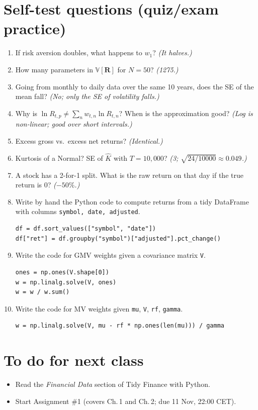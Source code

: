 \documentclass[11pt,a4paper]{report}
\newcommand{\V}{\mathbb{V}}
\newcommand{\R}{\bm{R}}
\begin{document}
\section{Self-test questions (quiz/exam practice)}
\begin{enumerate}
  \item If risk aversion doubles, what happens to $w_1$? \emph{(It halves.)}
  \item How many parameters in $\V[\R]$ for $N=50$? \emph{(1275.)}
  \item Going from monthly to daily data over the same 10 years, does the SE of
    the mean fall? \emph{(No; only the SE of volatility falls.)}
  \item Why is $\ln R_{t,p}\neq\sum_n w_{t,n}\ln R_{t,n}$? When is the
    approximation good? \emph{(Log is non-linear; good over short intervals.)}
  \item Excess gross vs.\ excess net returns? \emph{(Identical.)}
  \item Kurtosis of a Normal? SE of $\hat K$ with $T=10{,}000$?
    \emph{(3; $\sqrt{24/10000}\approx0.049$.)}
  \item A stock has a 2-for-1 split. What is the raw return on that day if
    the true return is 0? \emph{($-50\%$.)}
  \item Write by hand the Python code to compute returns from a tidy
    DataFrame with columns \texttt{symbol, date, adjusted}.
\begin{lstlisting}
df = df.sort_values(["symbol", "date"])
df["ret"] = df.groupby("symbol")["adjusted"].pct_change()
\end{lstlisting}
  \item Write the code for GMV weights given a covariance matrix \texttt{V}.
\begin{lstlisting}
ones = np.ones(V.shape[0])
w = np.linalg.solve(V, ones)
w = w / w.sum()
\end{lstlisting}
  \item Write the code for MV weights given \texttt{mu}, \texttt{V},
    \texttt{rf}, \texttt{gamma}.
\begin{lstlisting}
w = np.linalg.solve(V, mu - rf * np.ones(len(mu))) / gamma
\end{lstlisting}
\end{enumerate}

\section{To do for next class}
\begin{itemize}
  \item Read the \emph{Financial Data} section of Tidy Finance with Python.
  \item Start Assignment \#1 (covers Ch.\,1 and Ch.\,2; due 11 Nov, 22:00 CET).
\end{itemize}
\end{document}
